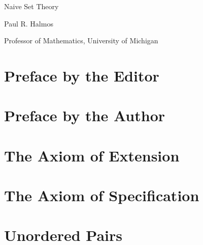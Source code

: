 \documentclass[fontsize=12pt,b5paper,pagesize=auto,openany]{book}
\theoremstyle{axiom}
\theoremstyle{exc}
\begin{document}
\frontmatter

\begin{titlepage}
 \vspace*{1cm}
 {\huge\raggedright Naive Set Theory\par}
 \noindent\hrulefill\par
 {\LARGE\raggedleft Paul R. Halmos\textsuperscript{\textdagger}\par}
 \vfill
 {\Large\raggedright\textsuperscript{\textdagger}Professor of Mathematics, University of Michigan\par}
\end{titlepage}

\setlength{\headheight}{14.49998pt}
\setlength{\parindent}{0.75\parindent}

\setcounter{secnumdepth}{-1}
\chapter{Preface by the Editor} 


\chapter{Preface by the Author} 


\clearpage{}

\newlength{\numlen}
\setlength{\numlen}{1em}
\renewcommand{\cftchapfont}{\scshape\bfseries}
\renewcommand{\cftchappresnum}{\hfill}
\renewcommand{\cftchapaftersnum}{\hspace*{\numlen}}
\addtolength{\cftchapnumwidth}{\numlen}
\setlength{\cftparskip}{-10pt}

\tableofcontents

\mainmatter
{}

\setcounter{secnumdepth}{0}

\chapter{The Axiom of Extension}


\chapter{The Axiom of Specification}


\chapter{Unordered Pairs}

\end{document}
